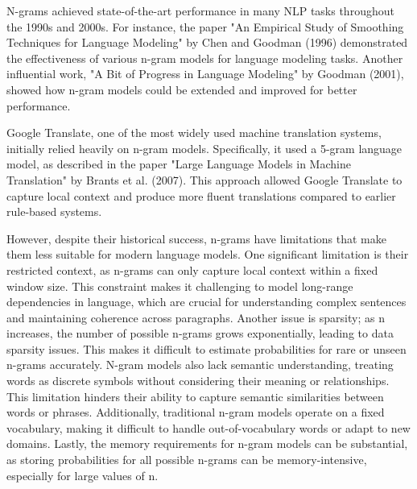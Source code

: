 \documentclass[a4paper, oneside]{discothesis}
\begin{document}
N-grams achieved state-of-the-art performance in many NLP tasks throughout the 1990s and 2000s. For instance, the paper "An Empirical Study of Smoothing Techniques for Language Modeling" by Chen and Goodman (1996) demonstrated the effectiveness of various n-gram models for language modeling tasks. Another influential work, "A Bit of Progress in Language Modeling" by Goodman (2001), showed how n-gram models could be extended and improved for better performance.

Google Translate, one of the most widely used machine translation systems, initially relied heavily on n-gram models. Specifically, it used a 5-gram language model, as described in the paper "Large Language Models in Machine Translation" by Brants et al. (2007). This approach allowed Google Translate to capture local context and produce more fluent translations compared to earlier rule-based systems.

However, despite their historical success, n-grams have limitations that make them less suitable for modern language models. One significant limitation is their restricted context, as n-grams can only capture local context within a fixed window size. This constraint makes it challenging to model long-range dependencies in language, which are crucial for understanding complex sentences and maintaining coherence across paragraphs. Another issue is sparsity; as n increases, the number of possible n-grams grows exponentially, leading to data sparsity issues. This makes it difficult to estimate probabilities for rare or unseen n-grams accurately. N-gram models also lack semantic understanding, treating words as discrete symbols without considering their meaning or relationships. This limitation hinders their ability to capture semantic similarities between words or phrases. Additionally, traditional n-gram models operate on a fixed vocabulary, making it difficult to handle out-of-vocabulary words or adapt to new domains. Lastly, the memory requirements for n-gram models can be substantial, as storing probabilities for all possible n-grams can be memory-intensive, especially for large values of n.
\end{document}
